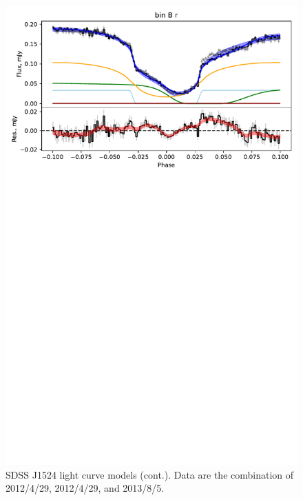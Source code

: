 \begin{figure}
    \centering
    \includegraphics[width=\textwidth, trim={0cm 17cm 0cm 0cm}, clip]{figures/results/SDSS1524/SDSS1524_4.pdf}
    \caption{SDSS J1524 light curve models (cont.). Data are the combination of 2012/4/29, 2012/4/29, and 2013/8/5.}
    \label{fig:SDSS1524 all light curves cont 3}
\end{figure}
